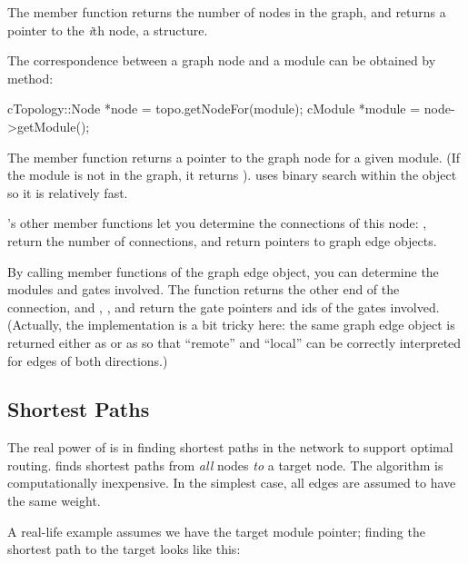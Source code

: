 The  member function returns the number of
nodes in the graph, and  returns a pointer to the \textit{i}th
node, a  structure.

The correspondence between a graph node and a module can be obtained
by  method:

\begin{cpp}
cTopology::Node *node = topo.getNodeFor(module);
cModule *module = node->getModule();
\end{cpp}

The  member function returns a pointer to the graph
node for a given module. (If the module is not in the graph, it
returns ).  uses binary search within the
 object so it is relatively fast.

's other member functions let you determine the
connections of this node: ,  return
the number of connections,  and
 return pointers to graph edge objects.

By calling member functions of the graph edge object, you can
determine the modules and gates involved. The 
function returns the other end of the connection, and
, ,  and
 return the gate pointers and ids of the gates
involved. (Actually, the implementation is a bit tricky here: the same
graph edge object  is returned either as
 or as  so that ``remote''
and ``local'' can be correctly interpreted for edges of both
directions.)


\subsection{Shortest Paths}
\label{sec:sim-lib:ctopology-shortest-paths}

The real power of  is in finding shortest
paths in the network to support optimal
routing.  finds shortest paths
from \textit{all} nodes \textit{to} a target node. The algorithm is
computationally inexpensive. In the simplest case, all edges are
assumed to have the same weight.

A real-life example assumes we have the target module pointer; finding
the shortest path to the target looks like this:

